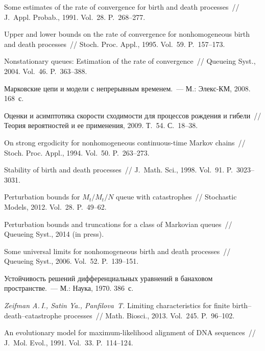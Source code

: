 \begin{multicols}{2}
{{\begin{thebibliography}{99}
 Some estimates of the rate of convergence for birth and death processes~//
J.~Appl. Probab., 1991. Vol.~28. P.~268--277.

Upper and lower bounds on the rate of convergence for nonhomogeneous
birth and death processes~// Stoch. Proc. Appl., 1995. Vol.~59. P.~157--173.

 Nonstationary queues:
Estimation of the rate of convergence~// Queueing Syst., 2004. Vol.~46. P.~363--388.

Марковские цепи и модели с непрерывным временем.~--- М.: Элекс-КМ, 2008. 168~с.

Оценки и асимптотика скорости сходимости для процессов рождения и гибели~//
Теория вероятностей и ее применения, 2009. Т.~54. С.~18--38.

On strong ergodicity for nonhomogeneous continuous-time Markov chains~// Stoch. Proc. Appl.,
1994. Vol.~50. P.~263--273.

  Stability of birth and death processes~//  J.~Math. Sci., 1998.
Vol.~91. P.~3023--3031.

  Perturbation bounds for $M_t/M_t/N$
queue with catastrophes~// Stochastic Models, 2012. Vol.~28. P.~49--62.

Perturbation bounds and truncations for a class of Markovian queues~//
Queueing Syst.,  2014 (in press).

Some universal limits for nonhomogeneous birth and death processes~// Queueing Syst., 2006.
Vol.~52. P.~139--151.

 Устойчивость решений
диф\-фе\-рен\-циальных уравнений в банаховом пространстве.~--- М.: Наука, 1970. 386~с.

{\it Zeifman A.\,I., Satin Ya., Panfilova~T.} Limiting characteristics
for finite birth--death--catastrophe processes~// Math. Biosci., 2013.
Vol.~245. P.~96--102.

An evolutionary model for maximum-likelihood alignment of DNA sequences~//
J.~Mol. Evol., 1991. Vol.~33. P.~114--124.


\end{thebibliography}}}
\end{multicols}

